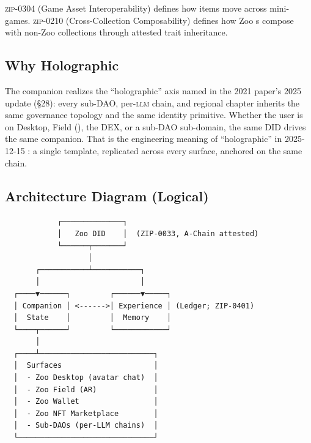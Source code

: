 \textsc{zip-0304} (Game Asset Interoperability) defines how items move
across mini-games. \textsc{zip-0210} (Cross-Collection Composability)
defines how Zoo \NFT{}s compose with non-Zoo collections through
attested trait inheritance.

\subsection{Why Holographic}

The companion realizes the ``holographic'' axis named in the 2021
paper's 2025 update (\S28): every sub-DAO, per-\textsc{llm} chain, and
regional chapter inherits the same governance topology and the same
identity primitive. Whether the user is on Desktop, Field (\AR{}), the
DEX, or a sub-DAO sub-domain, the same DID drives the same companion.
That is the engineering meaning of ``holographic'' in 2025-12-15
\Zoo{}: a single template, replicated across every surface, anchored
on the same chain.

\subsection{Architecture Diagram (Logical)}

\begin{verbatim}
            ┌──────────────┐
            │   Zoo DID    │  (ZIP-0033, A-Chain attested)
            └──────┬───────┘
                   │
       ┌───────────┴───────────┐
       │                       │
  ┌────▼──────┐         ┌──────▼─────┐
  │ Companion │ <------>│ Experience │ (Ledger; ZIP-0401)
  │  State    │         │  Memory    │
  └────┬──────┘         └────────────┘
       │
  ┌────┴──────────────────────────┐
  │  Surfaces                     │
  │  - Zoo Desktop (avatar chat)  │
  │  - Zoo Field (AR)             │
  │  - Zoo Wallet                 │
  │  - Zoo NFT Marketplace        │
  │  - Sub-DAOs (per-LLM chains)  │
  └───────────────────────────────┘
\end{verbatim}
